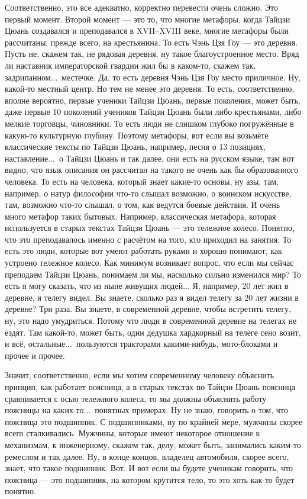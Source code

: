 Соответственно,  это все адекватно, корректно 
перевести очень сложно.  Это первый момент. Второй 
момент --- это то, что многие метафоры,  когда
Тайцзи Цюань создавался и преподавался в XVII--XVIII веке,
многие метафоры были рассчитаны, прежде всего,  на 
крестьянина. То есть Чэнь Цзя Гоу --- это деревня. Пусть 
не, скажем так, не рядовая деревня,  ну такое 
благоустроенное место.  Вряд ли наставник 
императорской гвардии жил бы в каком-то, скажем так,  
задрипанном...\ местечке. Да, то есть деревня Чэнь Цзя Гоу
место приличное.  Ну, какой-то местный центр. Но тем не 
менее это деревня. То есть, соответственно,  вполне 
вероятно,  первые ученики Тайцзи Цюань,  первые 
поколения, может быть, даже первые 10 поколений 
учеников Тайцзи Цюань были либо крестьянами, либо 
мелкие торговцы, чиновники. То есть люди не слишком 
глубоко погружённые в какую-то культурную глубину. 
Поэтому метафоры, вот если вы возьмёте классические 
тексты по Тайцзи Цюань, например, песня о 13 позициях, 
наставление...\ о Тайцзи Цюань и так далее,  они есть на 
русском языке, там вот видно,  что язык описания он 
рассчитан на такого не очень как бы образованного 
человека. То есть на человека,  который знает какие-то 
основы, ну азы, там, например, о натур философии что-то 
слышал  возможно, о воинском искусстве, там, возможно
что-то слышал, о том, как ведутся боевые действия. И 
очень много метафор таких бытовых. Например,  
классическая метафора, которая используется в старых 
текстах Тайцзи Цюань --- это тележное колесо.  Понятно,  
что это преподавалось именно с расчётом на того, кто 
приходил на занятия. То есть это люди, которые вот 
умеют работать руками и хорошо понимают, как устроено 
тележное колесо.  Как минимум возникает вопрос, что 
если мы сейчас преподаем Тайцзи Цюань, понимаем ли мы, 
насколько сильно изменился мир? То есть я могу 
сказать, что из ныне живущих людей... Я, например, 20 лет 
жил в деревне, я телегу видел. Вы знаете, сколько раз я 
видел телегу за 20 лет жизни в деревне? Три раза. Вы 
знаете, в современной деревне, чтобы встретить телегу, 
ну, это надо умудриться. Потому что люди в современной 
деревне на телегах не ездят. Там какой-то, может быть, 
один дедушка хардкорный на телеге сено возит, и всё, 
остальные...\ пользуются тракторами какими-нибудь, 
мото-блоками и прочее и прочее.

Значит, 
соответственно,  если мы хотим современному человеку 
объяснить принцип, как работает поясница,  а в старых 
текстах по Тайцзи Цюань поясница сравнивается с осью 
тележного колеса, то мы должны объяснить работу 
поясницы на каких-то...\ понятных примерах. Ну не знаю,  
говорить о том, что поясница это подшипник. С 
подшипниками, ну по крайней мере, мужчины скорее всего 
сталкивались. Мужчины, которые имеют некоторое 
отношение к механизмам, к инженерному, скажем так, 
делу, может быть, занимались каким-то ремеслом и так 
далее.  Ну, в конце концов,  владелец автомобиля, скорее 
всего, знает, что такое подшипник. Вот. И вот если вы 
будете ученикам говорить, что поясница --- это 
подшипник, на котором крутится тело, то это хоть как-то 
будет понятно.

